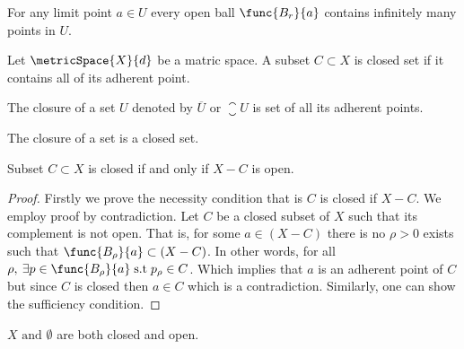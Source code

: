 \begin{note}
    For any limit point \(a \in U\) every open ball \(\func{B_r}{a}\) contains infinitely many points in \(U\).
\end{note}

\begin{definition} 
    Let \(\metricSpace{X}{d}\) be a matric space. A subset \(C \subset X\) is closed set if it contains all of its adherent point.
\end{definition}

\begin{definition} [Closure]
    The closure of a set \(U\) denoted by \(\overline{U}\) or \(\closure U\) is set of all its adherent points.
\end{definition}

\begin{note}
    The closure of a set is a closed set.
\end{note}

\begin{theorem}
    Subset \(C \subset X\) is closed if and only if \(X - C\) is open.
\end{theorem}

\begin{proof}
    Firstly we prove the necessity condition that is \(C\) is closed if \(X - C\). We employ proof by contradiction. Let \(C\) be a closed subset of \(X\) such that its complement is not open. That is, for some \(a \in (X - C)\) there is no \(\rho > 0\) exists such that \(\func{B_\rho}{a} \subset (X-C)\). In other words, for all \(\rho,\: \exists p \in \func{B_\rho}{a} \;\mathrm{ s.t }\; p_\rho \in C\). Which implies that \(a\) is an adherent point of \(C\) but since \(C\) is closed then \(a \in C\) which is a contradiction. Similarly, one can show the sufficiency condition.
\end{proof}

\begin{corollary}
    \(X \text{ and } \emptyset\) are both closed and open.
\end{corollary}


